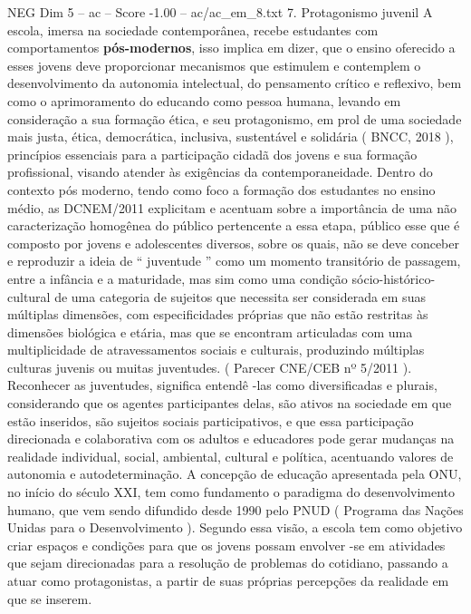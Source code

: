 \begin{textsample}{NEG Dim 5 – ac – Score -1.00 – ac/ac\_em\_8.txt}  \label{ex:f5_neg_161}
7.
Protagonismo juvenil A escola, imersa na sociedade contemporânea, recebe estudantes com comportamentos \textbf{pós-modernos}, isso implica em dizer, que o ensino oferecido a esses jovens deve proporcionar mecanismos que estimulem e contemplem o desenvolvimento da autonomia intelectual, do pensamento crítico e reflexivo, bem como o aprimoramento do educando como pessoa humana, levando em consideração a sua formação ética, e seu protagonismo, em prol de uma sociedade mais justa, ética, democrática, inclusiva, sustentável e solidária ( BNCC, 2018 ), princípios essenciais para a participação cidadã dos jovens e sua formação profissional, visando atender às exigências da contemporaneidade.
Dentro do contexto pós moderno, tendo como foco a formação dos estudantes no ensino médio, as DCNEM/2011 explicitam e acentuam sobre a importância de uma não caracterização homogênea do público pertencente a essa etapa, público esse que é composto por jovens e adolescentes diversos, sobre os quais, não se deve conceber e reproduzir a ideia de “ juventude ” como um momento transitório de passagem, entre a infância e a maturidade, mas sim como uma condição sócio-histórico-cultural de uma categoria de sujeitos que necessita ser considerada em suas múltiplas dimensões, com especificidades próprias que não estão restritas às dimensões biológica e etária, mas que se encontram articuladas com uma multiplicidade de atravessamentos sociais e culturais, produzindo múltiplas culturas juvenis ou muitas juventudes. ( Parecer CNE/CEB nº 5/2011 ).
Reconhecer as juventudes, significa entendê -las como diversificadas e plurais, considerando que os agentes participantes delas, são ativos na sociedade em que estão inseridos, são sujeitos sociais participativos, e que essa participação direcionada e colaborativa com os adultos e educadores pode gerar mudanças na realidade individual, social, ambiental, cultural e política, acentuando valores de autonomia e autodeterminação.
A concepção de educação apresentada pela ONU, no início do século XXI, tem como fundamento o paradigma do desenvolvimento humano, que vem sendo difundido desde 1990 pelo PNUD ( Programa das Nações Unidas para o Desenvolvimento ).
Segundo essa visão, a escola tem como objetivo criar espaços e condições para que os jovens possam envolver -se em atividades que sejam direcionadas para a resolução de problemas do cotidiano, passando a atuar como protagonistas, a partir de suas próprias percepções da realidade em que se inserem.

\end{textsample}
